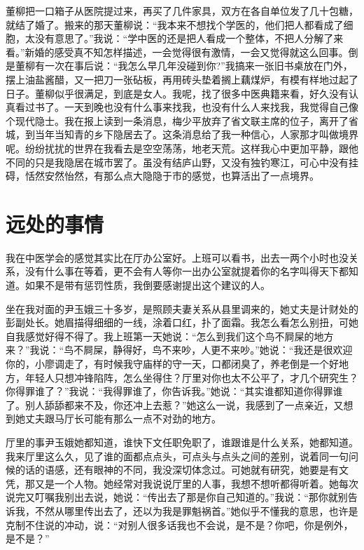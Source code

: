 \documentclass[12pt,oneside]{book}
\begin{document}
董柳把一口箱子从医院提过来，再买了几件家具，双方在各自单位发了几十包糖，就结了婚了。搬来的那天董柳说：``我本来不想找个学医的，他们把人都看成了细胞，太没有意思了。''我说：``学中医的还是把人看成一个整体，不把人分解了来看。''新婚的感受真不知怎样描述，一会觉得很有激情，一会又觉得就这么回事。倒是董柳有一次在事后说：``我怎么早几年没碰到你?''我搞来一张旧书桌放在门外，摆上油盐酱醋，又一把刀一张砧板，再用砖头垫着搁上藕煤炉，有模有样地过起了日子。董柳似乎很满足，到底是女人。我呢，找了很多中医典籍来看，好久没有认真看过书了。一天到晚也没有什么事来找我，也没有什么人来找我，我觉得自己像个现代隐士。我在报上读到一条消息，梅少平放弃了省文联主席的位子，离开了省城，到当年当知青的乡下隐居去了。这条消息给了我一种信心，人家那才叫做境界呢。纷纷扰扰的世界在我看去是空空荡荡，地老天荒。这样我心中更加平静，跟他不同的只是我隐居在城市罢了。虽没有结庐山野，又没有独钓寒江，可心中没有挂碍，恬然安然怡然，有那么点大隐隐于市的感觉，也算活出了一点境界。


\chapter{远处的事情}
我在中医学会的感觉其实比在厅办公室好。上班可以看书，出去一两个小时也没关系，没有什么事在等着，更不会有人等你一出办公室就提着你的名字叫得天下都知道。如果不是带有惩罚性质，我倒要感谢提出这个建议的人。

坐在我对面的尹玉娥三十多岁，是照顾夫妻关系从县里调来的，她丈夫是计财处的彭副处长。她眉描得细细的一线，涂着口红，扑了面霜。我怎么看怎么别扭，可她自我感觉好得不得了。我上班第一天她说：``怎么到我们这个鸟不屙屎的地方来？''我说：``鸟不屙屎，静得好，鸟不来吵，人更不来吵。''她说：``我还是很欢迎你的，小廖调走了，有时候我守庙样的守一天，口都闭臭了，养老倒是一个好地方，年轻人只想冲锋陷阵，怎么坐得住？厅里对你也太不公平了，才几个研究生？你得罪谁了？''我说：``我得罪谁了，你告诉我。''她说：``其实谁都知道你得罪谁了。别人舔舔都来不及，你还冲上去惹？''她这么一说，我感到了一点亲近，又想到她丈夫跟马厅长可能有那么一点不对劲的地方。

厅里的事尹玉娥她都知道，谁快下文任职免职了，谁跟谁是什么关系，她都知道。我来厅里这么久，见了谁的面都点点头，可点头与点头之间的差别，说着同一句问候的话的语感，还有眼神的不同，我没深切体念过。可她就有研究，她要是有文凭，那又是一个人物。她经常对我说说厅里的人事，我想不想听都得听着。她每次说完又叮嘱我别出去说，她说：``传出去了那是你自己知道的。''我说：``那你就别告诉我，不然从哪里传出去了，还以为我是罪魁祸首。''她似乎不懂我的意思，也许是克制不住说的冲动，说：``对别人很多话我也不会说，是不是？你吧，你是例外，是不是？''
\end{document}
